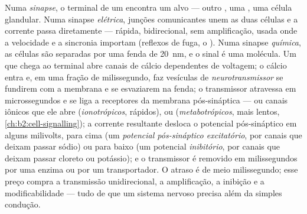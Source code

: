 \begin{definition}\label{def:b2:neurons-synapses:synapse}
Numa \emph{sinapse}, o terminal de um  encontra um alvo --- outro
, uma , uma célula glandular. Numa sinapse
\emph{elétrica}, junções comunicantes unem as duas células e a corrente
passa diretamente --- rápida, bidirecional, sem amplificação, usada onde
a velocidade e a sincronia importam (reflexos de fuga, o ). Numa
sinapse \emph{química}, as células são separadas por uma fenda de
\qty{20}{nm}, e o sinal é uma molécula. Um  que chega
ao terminal abre canais de cálcio dependentes de voltagem; o cálcio
entra e, em uma fração de milissegundo, faz vesículas de
\emph{neurotransmissor} se fundirem com a membrana e se esvaziarem na
fenda; o transmissor atravessa em microssegundos e se liga a receptores
da membrana pós-sináptica --- ou canais iônicos que ele abre
(\emph{ionotrópicos}, rápidos), ou 
(\emph{metabotrópicos}, mais lentos, \cref{ch:b2:cell-signalling}); a corrente resultante
desloca o potencial pós-sináptico em alguns milivolts, para cima (um
\emph{potencial pós-sináptico excitatório}, por canais que deixam passar
sódio) ou para baixo (um potencial \emph{inibitório}, por canais que
deixam passar cloreto ou potássio); e o transmissor é removido em
milissegundos por uma enzima ou por um transportador. O atraso é de meio
milissegundo; esse preço compra a transmissão unidirecional, a
amplificação, a inibição e a modificabilidade --- tudo de que um sistema
nervoso precisa além da simples condução.
\end{definition}

